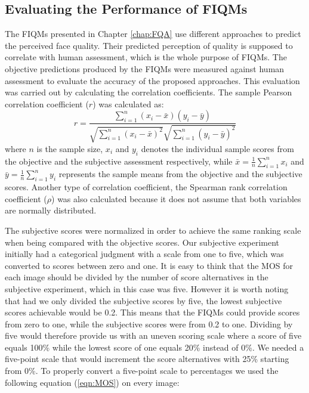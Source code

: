 \subsection{Evaluating the Performance of FIQMs}
The FIQMs presented in Chapter \ref{chap:FQA} use different approaches to predict the perceived face quality. Their predicted perception of quality is supposed to correlate with human assessment, which is the whole purpose of FIQMs. The objective predictions produced by the FIQMs were measured against human assessment to evaluate the accuracy of the proposed approaches. This evaluation was carried out by calculating the correlation coefficients. The sample Pearson correlation coefficient ($r$) was calculated as: 
\begin{equation}
    {\displaystyle r={\frac {\sum _{i=1}^{n}(x_{i}-{\bar {x}})(y_{i}-{\bar {y}})}{{\sqrt {\sum _{i=1}^{n}(x_{i}-{\bar {x}})^{2}}}{\sqrt {\sum _{i=1}^{n}(y_{i}-{\bar {y}})^{2}}}}}}
\end{equation}
where $n$ is the sample size, $x_{i}$ and $y_{i}$ denotes the individual sample scores from the objective and the subjective assessment respectively, while ${\bar {x}}={\frac {1}{n}}\sum _{i=1}^{n}x_{i}$ and ${\bar {y}}={\frac {1}{n}}\sum _{i=1}^{n}y_{i}$ represents the sample means from the objective and the subjective scores. Another type of correlation coefficient, the Spearman rank correlation coefficient ($\rho$) \cite{wiki:spearman} was also calculated because it does not assume that both variables are normally distributed.

The subjective scores were normalized in order to achieve the same ranking scale when being compared with the objective scores. Our subjective experiment initially had a categorical judgment with a scale from one to five, which was converted to scores between zero and one. It is easy to think that the MOS for each image should be divided by the number of score alternatives in the subjective experiment, which in this case was five. However it is worth noting that had we only divided the subjective scores by five, the lowest subjective scores achievable would be 0.2. This means that the FIQMs could provide scores from zero to one, while the subjective scores were from 0.2 to one. Dividing by five would therefore provide us with an uneven scoring scale where a score of five equals 100\% while the lowest score of one equals 20\% instead of 0\%. We needed a five-point scale that would increment the score alternatives with 25\% starting from 0\%. To properly convert a five-point scale to percentages we used the following equation (\ref{eqn:MOS}) on every image:

